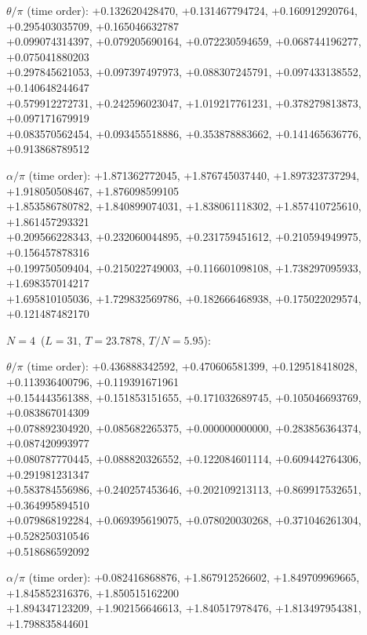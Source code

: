 \begin{flushleft}
\par\noindent$\theta/\pi$ (time order):
+0.132620428470, +0.131467794724, +0.160912920764, +0.295403035709, +0.165046632787 \\
+0.099074314397, +0.079205690164, +0.072230594659, +0.068744196277, +0.075041880203 \\
+0.297845621053, +0.097397497973, +0.088307245791, +0.097433138552, +0.140648244647 \\
+0.579912272731, +0.242596023047, +1.019217761231, +0.378279813873, +0.097171679919 \\
+0.083570562454, +0.093455518886, +0.353878883662, +0.141465636776, +0.913868789512
\par\noindent$\alpha/\pi$ (time order):
+1.871362772045, +1.876745037440, +1.897323737294, +1.918050508467, +1.876098599105 \\
+1.853586780782, +1.840899074031, +1.838061118302, +1.857410725610, +1.861457293321 \\
+0.209566228343, +0.232060044895, +0.231759451612, +0.210594949975, +0.156457878316 \\
+0.199750509404, +0.215022749003, +0.116601098108, +1.738297095933, +1.698357014217 \\
+1.695810105036, +1.729832569786, +0.182666468938, +0.175022029574, +0.121487482170
\vspace{3pt}\par\noindent\textbf{$N=4$}\ ($L=31$, $T=23.7878$, $T/N=5.95$):
\par\noindent$\theta/\pi$ (time order):
+0.436888342592, +0.470606581399, +0.129518418028, +0.113936400796, +0.119391671961 \\
+0.154443561388, +0.151853151655, +0.171032689745, +0.105046693769, +0.083867014309 \\
+0.078892304920, +0.085682265375, +0.000000000000, +0.283856364374, +0.087420993977 \\
+0.080787770445, +0.088820326552, +0.122084601114, +0.609442764306, +0.291981231347 \\
+0.583784556986, +0.240257453646, +0.202109213113, +0.869917532651, +0.364995894510 \\
+0.079868192284, +0.069395619075, +0.078020030268, +0.371046261304, +0.528250310546 \\
+0.518686592092
\par\noindent$\alpha/\pi$ (time order):
+0.082416868876, +1.867912526602, +1.849709969665, +1.845852316376, +1.850515162200 \\
+1.894347123209, +1.902156646613, +1.840517978476, +1.813497954381, +1.798835844601 \\

\end{flushleft}
